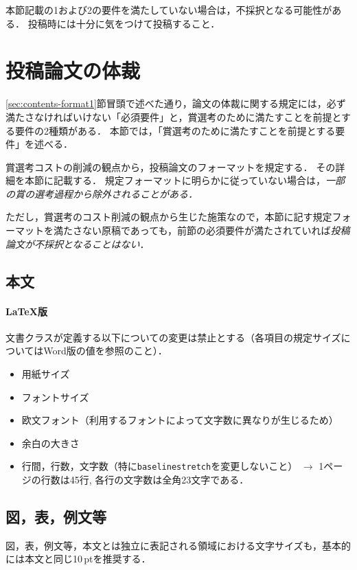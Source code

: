 \documentclass[
  platex, dvipdfmx,  %
]{nlp2024}
\newcommand{\code}[1]{\texttt{#1}}
\begin{document}
本節記載の1および2の要件を満たしていない場合は，不採択となる可能性がある．
投稿時には十分に気をつけて投稿すること．



\section{投稿論文の体裁}
\label{sec:contents-format2}
\ref{sec:contents-format1}節冒頭で述べた通り，論文の体裁に関する規定には，必ず満たさなければいけない「必須要件」と，賞選考のために満たすことを前提とする要件の2種類がある．
本節では，「賞選考のために満たすことを前提とする要件」を述べる．

賞選考コストの削減の観点から，投稿論文のフォーマットを規定する．
その詳細を本節に記載する．
規定フォーマットに明らかに従っていない場合は，\emph{一部の賞の選考過程から除外されることがある．}

ただし，賞選考のコスト削減の観点から生じた施策なので，本節に記す規定フォーマットを満たさない原稿であっても，前節の必須要件が満たされていれば\emph{投稿論文が不採択となることはない}．



\subsection{本文}

\paragraph{LaTeX版}
文書クラスが定義する以下についての変更は禁止とする（各項目の規定サイズについてはWord版の値を参照のこと）．
\begin{itemize}
\item 用紙サイズ
\item フォントサイズ
\item 欧文フォント（利用するフォントによって文字数に異なりが生じるため）
\item 余白の大きさ
\item 行間，行数，文字数（特に\code{baselinestretch}を変更しないこと） $\rightarrow$ 1ページの行数は45行, 各行の文字数は全角23文字である．
\end{itemize}





\subsection{図，表，例文等}
図，表，例文等，本文とは独立に表記される領域における文字サイズも，基本的には本文と同じ10\,ptを推奨する．
\end{document}
